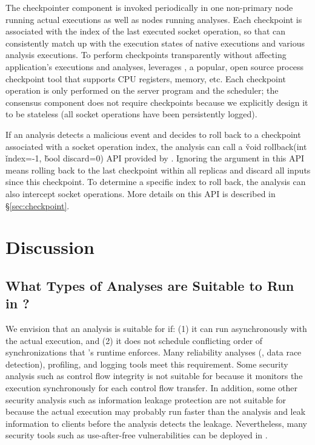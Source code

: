 The checkpointer component is invoked periodically in one non-primary node 
running actual executions as well as nodes running analyses. Each 
checkpoint is associated with the index of the last executed socket operation, 
so that \xxx can consistently match up with the execution states of native 
executions and various analysis executions. To perform checkpoints 
transparently without affecting application's executions and analyses, \xxx 
leverages \criu, a popular, open source process checkpoint tool that supports 
CPU registers, memory, etc. Each checkpoint operation is only performed on the 
server program and the \dmt scheduler; the \paxos consensus component does not 
require checkpoints because we explicitly design it to be stateless (all socket 
operations have been persistently logged).


If an analysis detects a malicious event and decides to roll back to a 
checkpoint associated with a socket operation index, the analysis can call a 
\v{void rollback(int} \v{index=-1,} \v{bool discard=0)} API provided 
by \xxx. Ignoring the argument in this API means rolling back to the last 
checkpoint within all replicas and discard all inputs since this checkpoint. To 
determine a specific index to roll back, the analysis can also intercept socket 
operations. More details on this API is described in \S\ref{sec:checkpoint}.



\section{Discussion} \label{sec:discuss}

\subsection{What Types of Analyses are Suitable to Run in \xxx?} 
\label{sec:analysis-types}

We envision that an analysis is suitable for \xxx if: (1) it can run 
asynchronously with the actual execution, and (2) it does not schedule 
conflicting order of \pthread synchronizations that \xxx's \dmt runtime 
enforces. Many reliability analyses (\eg, data race detection), profiling, 
and logging tools meet this requirement. Some security analysis such as control 
flow integrity is not suitable for \xxx because it monitors the execution 
synchronously for each control flow transfer. In addition, some other security 
analysis such as information leakage protection are not suitable for \xxx 
because the actual execution may probably run faster than the 
analysis and leak information to clients before the analysis detects the 
leakage. Nevertheless, many security tools such as use-after-free 
vulnerabilities can be deployed in \xxx.

